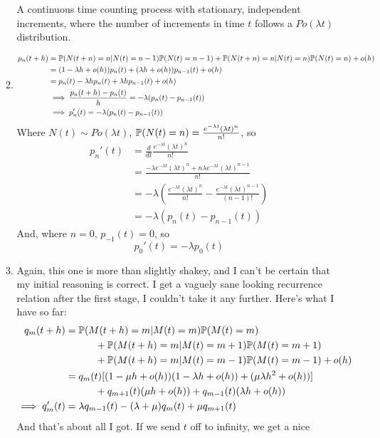 \documentclass{article}
\begin{document}
\begin{enumerate}
\begin{enumerate}
A continuous time counting process with stationary, independent increments,
where the number of increments in time $t$ follows a $Po(\lambda t)$
distribution.
\item
\begin{align*}
p_n(t+h) &= \mathbb{P}(N(t+n)=n | N(t) = n-1)\mathbb{P}(N(t)=n-1) + \mathbb{P}(N(t+n)=n | N(t) =
n)\mathbb{P}(N(t)=n) + o(h) \\
&= (1-\lambda h +o(h))p_n(t) + (\lambda h + o(h))p_{n-1}(t) + o(h)\\
&= p_n(t) -\lambda h p_n(t) + \lambda h p_{n-1}(t) + o(h)\\
&\implies \frac{p_n(t+h)-p_n(t)}{h} = -\lambda(p_n(t)-p_{n-1}(t))\\
&\implies p_n'(t) = -\lambda(p_n(t)-p_{n-1}(t))
\end{align*}
Where $N(t) \sim Po(\lambda t)$, $\mathbb{P}(N(t)=n) = \frac{e^{-\lambda t}(\lambda 
t)^n}{n!}$, so
\begin{align*}
p_n'(t) &= \frac{d}{dt} \frac{e^{-\lambda t}(\lambda t)^n}{n!}\\
&= \frac{-\lambda e^{-\lambda t}(\lambda t)^n + n \lambda e^{-\lambda t}(\lambda
t)^{n-1}}{n!}\\
&= -\lambda \left( \frac{e^{-\lambda t}(\lambda t)^n}{n!} - \frac{e^{-\lambda 
t}(\lambda t)^{n-1}}{(n-1)!}\right)\\
&= -\lambda(p_n(t) - p_{n-1}(t))
\end{align*}
And, where $n=0$, $p_{-1}(t) = 0$, so 
$$
p_0'(t) = -\lambda p_0(t)
$$
\item Again, this one is more than slightly shakey, and I can't be certain that
my initial reasoning is correct. I get a vaguely sane looking recurrence
relation after the first stage, I couldn't take it any further. Here's what I
have so far:
\begin{align*}
q_m(t+h) &= \mathbb{P}(M(t+h) = m | M(t) = m)\mathbb{P}(M(t)=m)\\
&\quad\quad\quad + \mathbb{P}(M(t+h)=m|M(t) = m+1) \mathbb{P}(M(t) = m+1)\\
&\quad\quad\quad + \mathbb{P}(M(t+h)=m|M(t) = m-1) \mathbb{P}(M(t) = m-1) +o(h)\\
&= q_{m}(t)[(1-\mu h + o(h))(1-\lambda h +o(h)) + (\mu\lambda h^2 +o(h))]\\
&\quad\quad\quad + q_{m+1}(t)(\mu h + o(h)) + q_{m-1}(t)(\lambda h + o(h))\\
\implies q_m'(t)& = \lambda q_{m-1}(t) - (\lambda + \mu) q_m(t) + \mu q_{m+1}(t)
\end{align*}
And that's about all I got. If we send $t$ off to infinity, we get a nice

\end{enumerate}
\end{enumerate}
\end{document}
